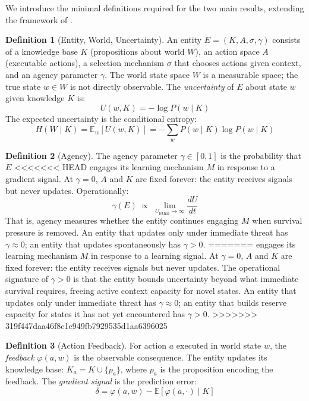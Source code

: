 \documentclass[11pt]{article}
\theoremstyle{definition}
\newtheorem{definition}{Definition}
\begin{document}
We introduce the minimal definitions required for the two main
results, extending the framework of \cite{McCarthy2026a}.

\begin{definition}[Entity, World, Uncertainty]
\label{def:entity}
An entity $E = (K, A, \sigma, \gamma)$ consists of a knowledge base $K$
(propositions about world $W$), an action space $A$ (executable
actions), a selection mechanism $\sigma$ that chooses actions given
context, and an agency parameter $\gamma$. The world state space $W$ is a
measurable space; the true state $w \in W$ is not directly observable.
The \emph{uncertainty} of $E$ about state $w$ given knowledge $K$ is:
\[
U(w, K) = -\log P(w \mid K)
\]
The expected uncertainty is the conditional entropy:
\[
H(W \mid K) = \mathbb{E}_w[U(w, K)] = -\sum_w P(w \mid K) \log P(w \mid K)
\]
\end{definition}

\begin{definition}[Agency]
\label{def:agency}
The agency parameter $\gamma \in [0,1]$ is the probability that $E$
<<<<<<< HEAD
engages its learning mechanism $M$ in response to a gradient signal.
At $\gamma = 0$, $A$ and $K$ are fixed forever: the entity receives
signals but never updates. Operationally:
\[
\gamma(E) \;\propto\; \lim_{U_{\mathrm{lethal}} \to \infty}
\frac{dU}{dt}
\]
That is, agency measures whether the entity continues engaging $M$
when survival pressure is removed. An entity that updates only under
immediate threat has $\gamma \approx 0$; an entity that updates
spontaneously has $\gamma > 0$.
=======
engages its learning mechanism $M$ in response to a learning signal.
At $\gamma = 0$, $A$ and $K$ are fixed forever: the entity receives
signals but never updates. The operational signature of $\gamma > 0$ is
that the entity bounds uncertainty beyond what immediate survival
requires, freeing active context capacity for novel states. An entity
that updates only under immediate threat has $\gamma \approx 0$; an
entity that builds reserve capacity for states it has not yet
encountered has $\gamma > 0$.
>>>>>>> 319f447daa46f8c1e949fb7929535d1aa6396025
\end{definition}

\begin{definition}[Action Feedback]
\label{def:feedback}
For action $a$ executed in world state $w$, the \emph{feedback}
$\varphi(a, w)$ is the observable consequence. The entity updates its
knowledge base: $K_a = K \cup \{p_a\}$, where $p_a$ is the
proposition encoding the feedback. The \emph{gradient signal} is the
prediction error:
\[
\delta = \varphi(a, w) - \mathbb{E}[\varphi(a, \cdot) \mid K]
\]
\end{definition}
\end{document}
